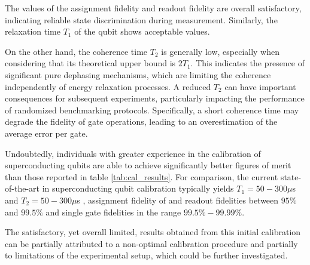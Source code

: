 The values of the assignment fidelity and readout fidelity are overall satisfactory, indicating reliable state discrimination during measurement. 
Similarly, the relaxation time $T_1$ of the qubit shows acceptable values.

On the other hand, the coherence time $T_2$ is generally low, especially when considering that its theoretical upper bound is $2T_1$. 
This indicates the presence of significant pure dephasing mechanisms, which are limiting the coherence independently of energy relaxation processes. 
A reduced $T_2$ can have important consequences for subsequent experiments, particularly impacting the performance of randomized benchmarking protocols. 
Specifically, a short coherence time may degrade the fidelity of gate operations, leading to an overestimation of the average error per gate.

Undoubtedly, individuals with greater experience in the calibration of superconducting qubits are able to achieve significantly better figures of merit than those reported in table \ref{tab:cal_results}.
For comparison, the current state-of-the-art in superconducting qubit calibration typically yields $T_1= 50-300 \mu$s \cite{Place2021-kc} and $T_2= 50-300 \mu$s \cite{Place2021-kc}, assignment fidelity of  and readout fidelities between $95\%$ and $99.5\%$ \cite{krantz_quantum_2019} and single gate fidelities in the range $99.5\% - 99.99\%$.

The satisfactory, yet overall limited, results obtained from this initial calibration can be partially attributed to a non-optimal calibration procedure and partially to limitations of the experimental setup, which could be further investigated.